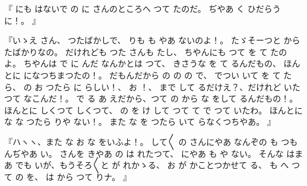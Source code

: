 
『
にも
はないで
の
に
さんのところへ
つて
たのだ。
ぢやあ
く
ひだらうに！。
』

『いゝえ
さん、
つたばかしで、
りも
も
やあ
ないのよ！。
たゞそーつと
から
たばかりなの。
だけれども
つた
さんも
たし、
ちやんにも
つて
を
て
たのよ。
ちやんは
で
に
んだ
なんかとは
つて、
きさうな
を
て
るんだもの、
ほんとに
になつちまつたの！。
だもんだから
の
の
の
で、
でつい
いて
を
て
たら、
の
お
つたら
に
らしい！、
お
！、
まで
して
るだけえ？、だけれど
いたつて
なこんだ！。
で
る
あ
えだから、つて
の
から
な
をして
るんだもの！。
ほんとに
しくつて
しくつて、
の
を
け
して
つて
て
で
つて
いたわ。
ほんとに
な
な
つたら
りや
ない！。
また
な
を
つたら
いて
らなくつちやあ。
』

『ハヽヽ、また
な
お
な
をいふよ！。
して〳〵
の
さんにやあ
なんぞの
も
つもんぢやあ
い。
さんを
きやあ
の
は
れたつて、
にやあ
も
や
ない。
そんな
はまあ
でも
いが、もうそろ〳〵と
が
れかゝる、
お
が
かことつかせて
る、
も
へ
つて
の
を、
は
から
つて
りナ。
』


